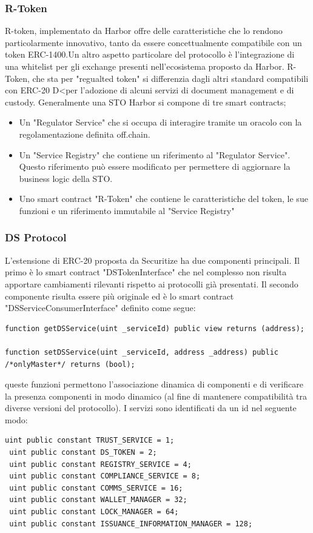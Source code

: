 \subsubsection{R-Token}
R-token, implementato da Harbor offre delle caratteristiche che lo rendono particolarmente innovativo, tanto da essere concettualmente compatibile con un token ERC-1400.Un altro aspetto particolare del protocollo è l'integrazione di una whitelist per gli exchange presenti nell'ecosistema proposto da Harbor. 
R-Token, che sta per "regualted token" si differenzia dagli altri standard compatibili con ERC-20 D<per l'adozione di alcuni servizi di document management e di custody. 
Generalmente una STO Harbor si compone di tre smart contracts;
\begin{itemize}
    \item Un "Regulator Service" che si occupa di interagire tramite un oracolo con la regolamentazione definita off.chain. 
    \item Un "Service Registry" che contiene un riferimento al "Regulator Service". Questo riferimento può essere modificato per permettere di aggiornare la business logic della STO. 
    \item Uno smart contract "R-Token" che contiene le caratteristiche del token, le sue funzioni e un riferimento immutabile al "Service Registry"
\end{itemize}
\subsubsection{DS Protocol}
L'estensione di ERC-20 proposta da Securitize ha due componenti principali. Il primo è lo smart contract "DSTokenInterface" che nel complesso non risulta apportare cambiamenti rilevanti rispetto ai protocolli già presentati. Il secondo componente risulta essere più originale ed è lo smart contract "DSServiceConsumerInterface" definito come segue:
\begin{lstlisting}[language=Solidity,numbers=none]
function getDSService(uint _serviceId) public view returns (address);

function setDSService(uint _serviceId, address _address) public /*onlyMaster*/ returns (bool);
\end{lstlisting}
queste funzioni permettono l'associazione dinamica di componenti e di verificare la presenza componenti  in modo dinamico (al fine di mantenere compatibilità tra diverse versioni del protocollo). I servizi sono identificati da un id nel seguente modo:
\begin{lstlisting}[language=Solidity,numbers=none]
 uint public constant TRUST_SERVICE = 1;
 uint public constant DS_TOKEN = 2;
 uint public constant REGISTRY_SERVICE = 4;
 uint public constant COMPLIANCE_SERVICE = 8;
 uint public constant COMMS_SERVICE = 16;
 uint public constant WALLET_MANAGER = 32;
 uint public constant LOCK_MANAGER = 64;
 uint public constant ISSUANCE_INFORMATION_MANAGER = 128;
 \end{lstlisting}
